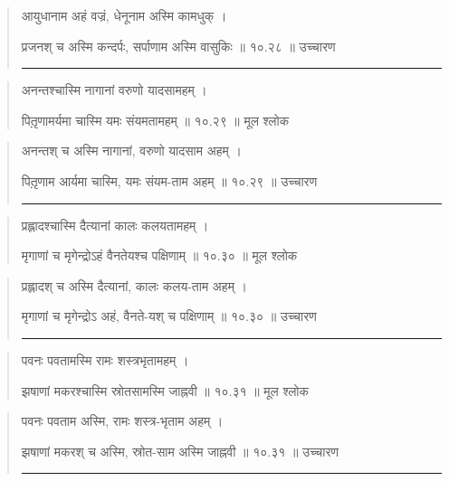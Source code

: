 \begin{quotation}

आयुधानाम अहं वज्रं, धेनूनाम अस्मि कामधुक्‌  ।  

प्रजनश् च अस्मि कन्दर्पः, सर्पाणाम अस्मि वासुकिः  ॥ १०.२८ ॥  उच्चारण

\noindent\rule{16cm}{0.4pt} 
\end{quotation}


\begin{quotation} 
अनन्तश्चास्मि नागानां वरुणो यादसामहम् ।  

पितृ़णामर्यमा चास्मि यमः संयमतामहम्  ॥ १०.२९ ॥  मूल श्लोक
\end{quotation}

\begin{quotation}

अनन्तश् च अस्मि नागानां, वरुणो यादसाम अहम्‌  ।  

पितृ़णाम आर्यमा चास्मि, यमः संयम-ताम अहम्‌  ॥ १०.२९ ॥  उच्चारण

\noindent\rule{16cm}{0.4pt} 
\end{quotation}


\begin{quotation} 

प्रह्लादश्चास्मि दैत्यानां कालः कलयतामहम् ।  

मृगाणां च मृगेन्द्रोऽहं वैनतेयश्च पक्षिणाम्  ॥ १०.३० ॥  मूल श्लोक
\end{quotation}

\begin{quotation}

प्रह्लादश् च अस्मि दैत्यानां, कालः कलय-ताम अहम्‌  ।  

मृगाणां च मृगेन्द्रोऽ अहं, वैनते-यश् च पक्षिणाम्‌  ॥ १०.३० ॥  उच्चारण

\noindent\rule{16cm}{0.4pt} 
\end{quotation}


\begin{quotation} 

पवनः पवतामस्मि रामः शस्त्रभृतामहम्‌  ।  

झषाणां मकरश्चास्मि स्रोतसामस्मि जाह्नवी  ॥ १०.३१ ॥  मूल श्लोक
\end{quotation}

\begin{quotation}

पवनः पवताम अस्मि, रामः शस्त्र-भृताम अहम्‌  ।  

झषाणां मकरश् च अस्मि, स्रोत-साम अस्मि जाह्नवी  ॥ १०.३१ ॥  उच्चारण

\noindent\rule{16cm}{0.4pt} 
\end{quotation}


